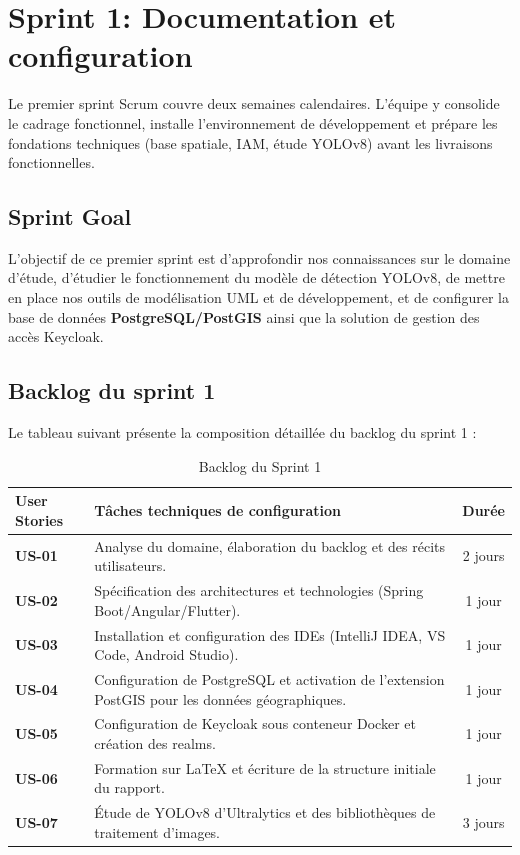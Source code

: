 \section{Sprint 1: Documentation et configuration}
Le premier sprint Scrum couvre deux semaines calendaires. L'équipe y consolide le cadrage fonctionnel, installe l'environnement de développement et prépare les fondations techniques (base spatiale, IAM, étude YOLOv8) avant les livraisons fonctionnelles.

\subsection{Sprint Goal}
L'objectif de ce premier sprint est d'approfondir nos connaissances sur le domaine d'étude, d'étudier le fonctionnement du modèle de détection YOLOv8, de mettre en place nos outils de modélisation UML et de développement, et de configurer la base de données \textbf{PostgreSQL/PostGIS} ainsi que la solution de gestion des accès Keycloak.

\subsection{Backlog du sprint 1}
Le tableau suivant présente la composition détaillée du backlog du sprint 1 :

\begin{table}[H]
    \centering
    \caption{Backlog du Sprint 1}
    \label{tab:backlog_sprint1}
    \vspace{0.2cm}
    \small
    \begin{tabularx}{\textwidth}{|l|X|c|}
        \hline
        \textbf{User Stories} & \textbf{Tâches techniques de configuration} & \textbf{Durée} \\ \hline
        \textbf{US-01} & Analyse du domaine, élaboration du backlog et des récits utilisateurs. & 2 jours \\ \hline
        \textbf{US-02} & Spécification des architectures et technologies (Spring Boot/Angular/Flutter). & 1 jour \\ \hline
        \textbf{US-03} & Installation et configuration des IDEs (IntelliJ IDEA, VS Code, Android Studio). & 1 jour \\ \hline
        \textbf{US-04} & Configuration de PostgreSQL et activation de l'extension PostGIS pour les données géographiques. & 1 jour \\ \hline
        \textbf{US-05} & Configuration de Keycloak sous conteneur Docker et création des realms. & 1 jour \\ \hline
        \textbf{US-06} & Formation sur LaTeX et écriture de la structure initiale du rapport. & 1 jour \\ \hline
        \textbf{US-07} & Étude de YOLOv8 d'Ultralytics et des bibliothèques de traitement d'images. & 3 jours \\ \hline
    \end{tabularx}
\end{table}

